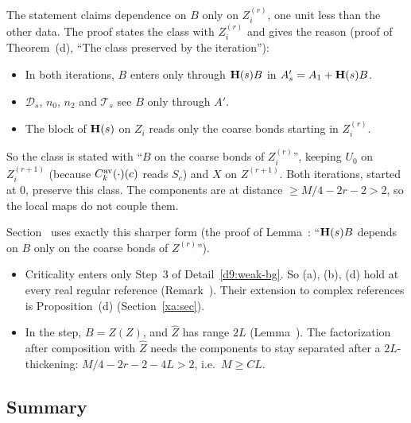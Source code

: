 \begin{detail}
\begin{step}
The statement claims dependence on $B$ only on $Z_i^{(r)}$, one unit less than the other data. The proof states the class with $Z_i^{(r)}$ and gives the reason (proof of Theorem~(d), ``The class preserved by the iteration''):
\begin{itemize}
\item In both iterations, $B$ enters only through $\mathbf H(s)B$ in $A'_s=A_1+\mathbf H(s)B$.
\item $\mathcal D_s$, $n_0$, $n_2$ and $\mathcal T_s$ see $B$ only through $A'$.
\item The block of $\mathbf H(s)$ on $Z_i$ reads only the coarse bonds starting in $Z_i^{(r)}$.
\end{itemize}
So the class is stated with ``$B$ on the coarse bonds of $Z_i^{(r)}$'', keeping $U_0$ on $Z_i^{(r+1)}$ (because $C^{\rm av}_k(\cdot)(c)$ reads $S_c$) and $X$ on $Z^{(r+1)}$. Both iterations, started at $0$, preserve this class. The components are at distance $\ge M/4-2r-2>2$, so the local maps do not couple them.

Section~ uses exactly this sharper form (the proof of Lemma~: ``$\mathbf H(s)B$ depends on $B$ only on the coarse bonds of $Z^{(r)}$'').
\end{step}
\end{detail}

\begin{detail}\label{d9:bg-remarks}
\begin{itemize}
\item Criticality enters only Step~3 of Detail~\ref{d9:weak-bg}. So (a), (b), (d) hold at every real regular reference (Remark~). Their extension to complex references is Proposition~(d) (Section~\ref{xa:sec}).
\item In the step, $B=\hat Z(Z)$, and $\hat Z$ has range $2L$ (Lemma~). The factorization after composition with $\hat Z$ needs the components to stay separated after a $2L$-thickening: $M/4-2r-2-4L>2$, i.e.\ $M\ge CL$.
\end{itemize}
\end{detail}

\subsection{Summary}\label{d9:status}

